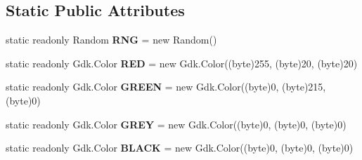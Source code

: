 \subsection*{Static Public Attributes}
\begin{DoxyCompactItemize}
\item 
\mbox{\label{class_main_window_a1ddfc1a8ba6354a1a9d29fa8ba942caa}} 
static readonly Random {\bfseries R\+NG} = new Random()
\item 
\mbox{\label{class_main_window_ad3cdf380f793df7d8df3632b8073093d}} 
static readonly Gdk.\+Color {\bfseries R\+ED} = new Gdk.\+Color((byte)255, (byte)20, (byte)20)
\item 
\mbox{\label{class_main_window_abf9286e51d9c9868c1d1c420383bc146}} 
static readonly Gdk.\+Color {\bfseries G\+R\+E\+EN} = new Gdk.\+Color((byte)0, (byte)215, (byte)0)
\item 
\mbox{\label{class_main_window_ac8dc783760d112de13cd19cffa89e51e}} 
static readonly Gdk.\+Color {\bfseries G\+R\+EY} = new Gdk.\+Color((byte)0, (byte)0, (byte)0)
\item 
\mbox{\label{class_main_window_af583645658035054e22a48ba2e29fa61}} 
static readonly Gdk.\+Color {\bfseries B\+L\+A\+CK} = new Gdk.\+Color((byte)0, (byte)0, (byte)0)
\end{DoxyCompactItemize}
